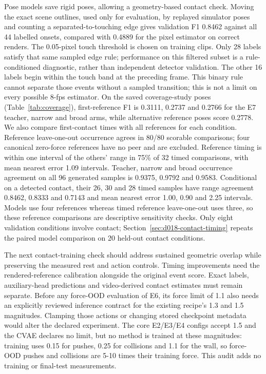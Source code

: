 \documentclass[11pt,a4paper]{article}
\begin{document}
\label{sec:pose-contact}Pose models save rigid poses, allowing a geometry-based contact check. Moving the exact scene outlines, used only for evaluation, by replayed simulator poses and counting a separated-to-touching edge gives validation F1 0.8462 against all 44 labelled onsets, compared with 0.4889 for the pixel estimator on correct renders. The 0.05-pixel touch threshold is chosen on training clips. Only 28 labels satisfy that same sampled edge rule; performance on this filtered subset is a rule-conditioned diagnostic, rather than independent detector validation. The other 16 labels begin within the touch band at the preceding frame. This binary rule cannot separate those events without a sampled transition; this is not a limit on every possible 8-fps estimator. On the saved coverage-study poses (Table~\ref{tab:coverage}), first-reference F1 is 0.3111, 0.2737 and 0.2766 for the E7 teacher, narrow and broad arms, while alternative reference poses score 0.2778. We also compare first-contact times with all references for each condition. Reference leave-one-out occurrence agrees in 80/80 scorable comparisons; four canonical zero-force references have no peer and are excluded. Reference timing is within one interval of the others' range in 75\% of 32 timed comparisons, with mean nearest error 1.09 intervals. Teacher, narrow and broad occurrence agreement on all 96 generated samples is 0.9375, 0.9792 and 0.9583. Conditional on a detected contact, their 26, 30 and 28 timed samples have range agreement 0.8462, 0.8333 and 0.7143 and mean nearest error 1.00, 0.90 and 2.25 intervals. Models use four references whereas timed reference leave-one-out uses three, so these reference comparisons are descriptive sensitivity checks. Only eight validation conditions involve contact; Section~\ref{sec:d018-contact-timing} repeats the paired model comparison on 20 held-out contact conditions.

The next contact-training check should address sustained geometric overlap while preserving the measured rest and action controls. Timing improvements need the rendered-reference calibration alongside the original event score. Exact labels, auxiliary-head predictions and video-derived contact estimates must remain separate. Before any force-OOD evaluation of E6, its force limit of 1.1 also needs an explicitly reviewed inference contract for the existing recipe's 1.3 and 1.5 magnitudes. Clamping those actions or changing stored checkpoint metadata would alter the declared experiment. The core E2/E3/E4 configs accept 1.5 and the CVAE declares no limit, but no method is trained at these magnitudes: training uses 0.15 for pushes, 0.25 for collisions and 1.1 for the wall, so force-OOD pushes and collisions are 5-10 times their training force. This audit adds no training or final-test measurements.
\end{document}
